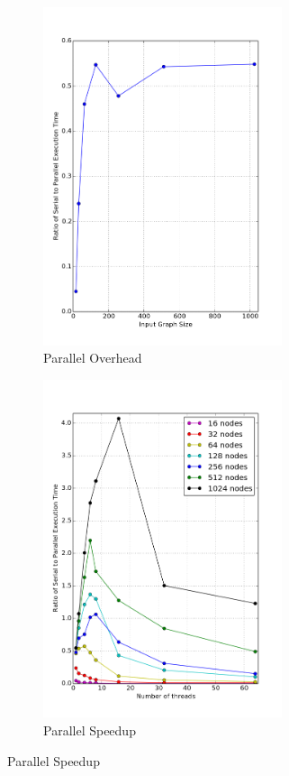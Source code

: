\documentclass{article}
\begin{document}
\begin{figure}[H]
  \centering
  \begin{subfigure}{70mm}
    \includegraphics[width=70mm]{./parallel-overhead.png}
    \caption{Parallel Overhead}
  \end{subfigure}
  \begin{subfigure}{60mm}
    \includegraphics[width=70mm]{./parallel-speedup.png}
    \caption{Parallel Speedup}
  \end{subfigure}
\end{figure}


\pagebreak
\end{document}
